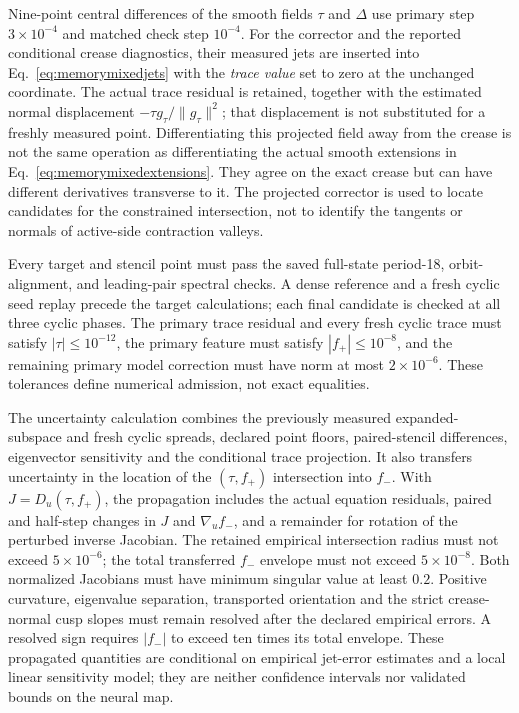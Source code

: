 \documentclass[11pt,letterpaper]{article}
\begin{document}
Nine-point central differences of the smooth fields $\tau$ and $\Delta$
use primary step $3\times10^{-4}$ and matched check step $10^{-4}$.
For the corrector and the reported conditional crease diagnostics, their
measured jets are inserted into
Eq.~\eqref{eq:memorymixedjets} with the \emph{trace value} set to zero at
the unchanged coordinate. The actual trace residual is retained, together
with the estimated normal displacement
$-\tau g_\tau/\|g_\tau\|^2$; that displacement is not substituted for a
freshly measured point. Differentiating this projected field away from
the crease is not the same operation as differentiating the actual
smooth extensions in Eq.~\eqref{eq:memorymixedextensions}. They agree
on the exact crease but can have different derivatives transverse to it.
The projected corrector is used to locate candidates for the constrained
intersection, not to identify the tangents or normals of active-side
contraction valleys.

Every target and stencil point must pass the saved full-state period-18, orbit-alignment,
and leading-pair spectral checks. A dense reference and a fresh cyclic
seed replay precede the target calculations; each final candidate is
checked at all three cyclic phases. The primary trace residual and every
fresh cyclic trace must satisfy $|\tau|\le10^{-12}$, the primary feature
must satisfy $|f_+|\le10^{-8}$, and the remaining primary model correction
must have norm at most $2\times10^{-6}$. These tolerances define numerical
admission, not exact equalities.

The uncertainty calculation combines the previously measured expanded-
subspace and fresh cyclic spreads, declared point floors, paired-stencil
differences, eigenvector sensitivity and the conditional trace projection.
It also transfers uncertainty in the location of the $(\tau,f_+)$
intersection into $f_-$. With $J=D_u(\tau,f_+)$, the propagation includes
the actual equation residuals, paired and half-step changes in $J$ and
$\nabla_u f_-$, and a remainder for rotation of the perturbed inverse
Jacobian. The retained empirical intersection radius must not exceed
$5\times10^{-6}$; the total transferred $f_-$ envelope must not exceed
$5\times10^{-8}$. Both normalized Jacobians must have minimum singular
value at least $0.2$. Positive curvature, eigenvalue separation,
transported orientation and the strict crease-normal cusp slopes must
remain resolved after the declared empirical errors. A resolved sign
requires $|f_-|$ to exceed ten times its total envelope. These propagated
quantities are conditional on empirical jet-error estimates and a local
linear sensitivity model; they are neither confidence intervals nor
validated bounds on the neural map.
\end{document}
